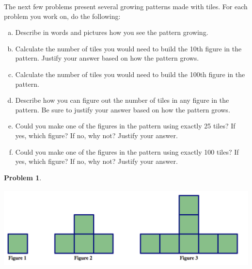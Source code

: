 \documentclass[12pt, reqno]{amsart}
\theoremstyle{remark}
\theoremstyle{definition}
\newtheorem{problem}{Problem}
\numberwithin{equation}{section}  %
\begin{document}
The next few problems present several growing patterns made with tiles.  For each problem you work on, do the following:
\begin{enumerate}[(a)]
\item
Describe in words and pictures how you see the pattern growing.\\

\item
Calculate the number of tiles you would need to build the 10th figure in the pattern.  Justify your answer based on how the pattern grows.\\

\item
Calculate the number of tiles you would need to build the 100th figure in the pattern.  \\

\item
Describe how you can figure out the number of tiles in any figure in the pattern.  Be sure to justify your answer based on how the pattern grows.\\

\item
Could you make one of the figures in the pattern using exactly 25 tiles?  If yes, which figure?  If no, why not?  Justify your answer.\\

\item
Could you make one of the figures in the pattern using exactly 100 tiles?  If yes, which figure?  If no, why not?    Justify your answer.\\



\end{enumerate}

\bigskip

\begin{problem}\ 

\begin{center}
\includegraphics[height=4.25cm]{pattern2}
\end{center}

\end{problem}
\end{document}
